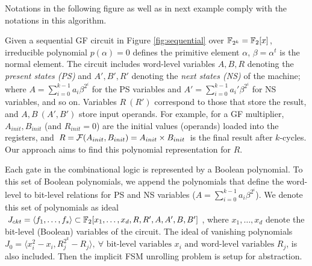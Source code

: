 Notations in the following figure as well as in next example comply with 
the notations in this algorithm.

\begin{figure}[H]
\end{figure}

Given a sequential GF circuit in Figure \ref{fig:sequential} over ${\mathbb{F}}_{2^k}={\mathbb{F}}_2[x]$, irreducible polynomial $p(\alpha) = 0$
defines the primitive element $\alpha$, $\beta = \alpha^t$ is the normal element.
The circuit includes word-level variables $A, B, R$
denoting the {\it present states (PS)} and $A', B', R'$ denoting the {\it next
  states (NS)} of the machine; where $A = \sum_{i=0}^{k-1} a_i \beta^{2^i}$
for the PS variables and $A' = \sum_{i=0}^{k-1} a_i'
\beta^{2^i}$ for NS variables, and so on.  Variables $R\ (R')$ correspond to those that 
store the result, and $A, B\ (A', B')$ store input operands. For example,
for a GF multiplier, $A_{init}, B_{init}$ (and $R_{init} =
0$) are the initial values (operands) loaded into the registers,  and
$R = {\mathcal{F}}(A_{init}, B_{init}) = A_{init} \times B_{init}$ is the final
result after $k$-cycles. Our approach aims to find this polynomial
representation for $R$.  

Each gate in the combinational logic is represented by a Boolean
polynomial. To 
this set of Boolean polynomials, we append the polynomials that define
the word-level to bit-level relations for PS and NS variables ($A =
\sum_{i=0}^{k-1} a_i \beta^{2^i}$). We denote this set of polynomials
as ideal $J_{ckt} = \langle 
f_1, \dots, f_s \rangle \subset {\mathbb{F}}_2[x_1, \dots, x_d, R, R', A, A', B,
  B']$, where $x_1, \dots, x_d$ denote the bit-level (Boolean) variables
  of the circuit. The ideal of vanishing polynomials 
$J_0 = \langle x_i^2-x_i,R_j^{2^k}-R_j\rangle,~\forall \text{ bit-level variables }x_i\text{ and word-level variables }R_j$, is also included. 
Then the implicit FSM unrolling problem is setup for abstraction. 


